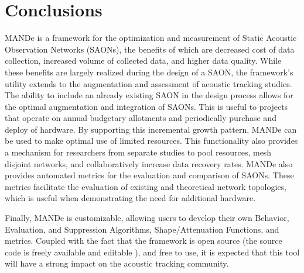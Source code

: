 \chapter{Conclusions}
MANDe is a framework for the optimization and measurement of Static Acoustic Observation Networks (SAONs), the benefits of which are decreased cost of data collection, increased volume of collected data, and higher data quality.  While these benefits are largely realized during the design of a SAON, the framework's utility extends to the augmentation and assessment of acoustic tracking studies.  The ability to include an already existing SAON in the design process allows for the optimal augmentation and integration of SAONs.  This is useful to projects that operate on annual budgetary allotments and periodically purchase and deploy of hardware.  By supporting this incremental growth pattern, MANDe can be used to make optimal use of limited resources.  This functionality also provides a mechanism for researchers from separate studies to pool resources, mesh disjoint networks, and collaboratively increase data recovery rates.  MANDe also provides automated metrics for the evaluation and comparison of SAONs.  These metrics facilitate the evaluation of existing and theoretical network topologies, which is useful when demonstrating the need for additional hardware.

Finally, MANDe is customizable, allowing users to develop their own Behavior, Evaluation, and Suppression Algorithms, Shape/Attenuation Functions, and metrics.  Coupled with the fact that the framework is open source (the source code is freely available and editable \cite{acousitcdeploy}), and free to use, it is expected that this tool will have a strong impact on the acoustic tracking community.  
